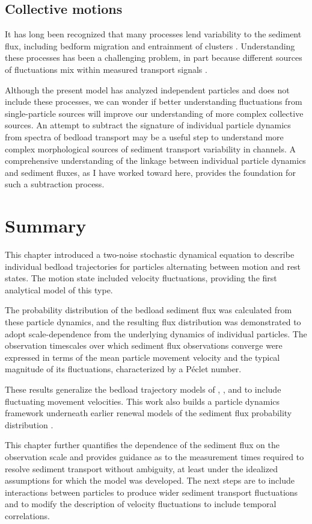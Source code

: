 \subsection{Collective motions}

It has long been recognized that many processes lend variability to the sediment flux, including bedform migration \citep{Hamamori1962,Guala2014} and entrainment of clusters \citep{Strom2004,Papanicolaou2018}.
Understanding these processes has been a challenging problem, in part because different sources of fluctuations mix within measured transport signals \citep[e.g.][]{Hoey1992,Singh2009,Saletti2015,Dhont2018}.

Although the present model has analyzed independent particles and does not include these processes, we can wonder if better understanding fluctuations from single-particle sources will improve our understanding of more complex collective sources.
An attempt to subtract the signature of individual particle dynamics from spectra of bedload transport may be a useful step to understand more complex morphological sources of sediment transport variability in channels.
A comprehensive understanding of the linkage between individual particle dynamics and sediment fluxes, as I have worked toward here, provides the foundation for such a subtraction process.

\section{Summary \label{sec:conc}} 
This chapter introduced a two-noise stochastic dynamical equation to describe individual bedload trajectories for particles alternating between motion and rest states. The motion state included velocity fluctuations, providing the first analytical model of this type.
 
The probability distribution of the bedload sediment flux was calculated from these particle dynamics, and the resulting flux distribution was demonstrated to adopt scale-dependence from the underlying dynamics of individual particles.
The observation timescales over which sediment flux observations converge were expressed in terms of the mean particle movement velocity and the typical magnitude of its fluctuations, characterized by a P\'{e}clet number.
 
These results generalize the bedload trajectory models of \citet{Einstein1937}, \citet{Lisle1998}, and \citet{Lajeunesse2017} to include fluctuating movement velocities. This work also builds a particle dynamics framework underneath earlier renewal models of the sediment flux probability distribution \citep{Lajeunesse2010,Ancey2020}.
 
This chapter further quantifies the dependence of the sediment flux on the observation scale and provides guidance as to the measurement times required to resolve sediment transport without ambiguity, at least under the idealized assumptions for which the model was developed.
The next steps are to include interactions between particles to produce wider sediment transport fluctuations and to modify the description of velocity fluctuations to include temporal correlations.

